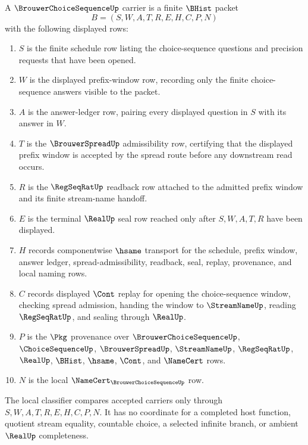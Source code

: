 \begin{definition}
\label{def:brouwer-choice-sequence-carrier}
A $\BrouwerChoiceSequenceUp$ carrier is a finite $\BHist$ packet
$$
B=(S,W,A,T,R,E,H,C,P,N)
$$
with the following displayed rows:
\begin{enumerate}
\item $S$ is the finite schedule row listing the choice-sequence questions and precision requests that have been opened.
\item $W$ is the displayed prefix-window row, recording only the finite choice-sequence answers visible to the packet.
\item $A$ is the answer-ledger row, pairing every displayed question in $S$ with its answer in $W$.
\item $T$ is the $\BrouwerSpreadUp$ admissibility row, certifying that the displayed prefix window is accepted by the spread route before any downstream read occurs.
\item $R$ is the $\RegSeqRatUp$ readback row attached to the admitted prefix window and its finite stream-name handoff.
\item $E$ is the terminal $\RealUp$ seal row reached only after $S,W,A,T,R$ have been displayed.
\item $H$ records componentwise $\hsame$ transport for the schedule, prefix window, answer ledger, spread-admissibility, readback, seal, replay, provenance, and local naming rows.
\item $C$ records displayed $\Cont$ replay for opening the choice-sequence window, checking spread admission, handing the window to $\StreamNameUp$, reading $\RegSeqRatUp$, and sealing through $\RealUp$.
\item $P$ is the $\Pkg$ provenance over $\BrouwerChoiceSequenceUp$, $\ChoiceSequenceUp$, $\BrouwerSpreadUp$, $\StreamNameUp$, $\RegSeqRatUp$, $\RealUp$, $\BHist$, $\hsame$, $\Cont$, and $\NameCert$ rows.
\item $N$ is the local $\NameCert_{\BrouwerChoiceSequenceUp}$ row.
\end{enumerate}
The local classifier compares accepted carriers only through $S,W,A,T,R,E,H,C,P,N$. It has no coordinate for a completed host function, quotient stream equality, countable choice, a selected infinite branch, or ambient $\RealUp$ completeness.
\end{definition}

